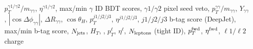 $p_T^{\gamma 1/\gamma 2}/m_{\gamma\gamma}$, $\eta^{\gamma 1/\gamma 2}$, max/min $\gamma$ ID BDT scores, $\gamma 1/\gamma 2$ pixel seed veto, $p_T^{\gamma\gamma}/{m_{\gamma\gamma}}$, $Y_{\gamma\gamma}$, $|\cos{\Delta\phi_{\gamma\gamma}}|$, $\Delta R_{\gamma\gamma}$, $\cos{\theta_H}$, $p_T^{j1/j2/j3}$, $\eta^{j1/j2/j3}$, $j1/j2/j3$ b-tag score (DeepJet), max/min b-tag score, $N_{\rm{jets}}$, $H_T$, \met, $p_T^\ell$, $\eta^\ell$, $N_{\rm{leptons}}$ (tight ID), $p_T^{\rm{fwd}}$, $\eta^{\rm{fwd}}$, $\ell 1/\ell 2$ charge